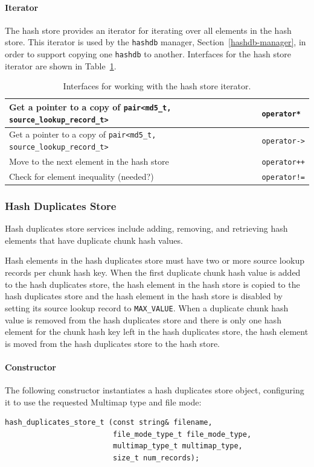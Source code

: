 \documentclass[10pt,twoside]{article}
\newcommand{\hdb}{\texttt{hashdb}\xspace}
\begin{document}
\paragraph{Iterator}
The hash store provides an iterator for iterating over all elements in the hash store.
This iterator is used by the \hdb manager, Section~\ref{hashdb-manager},
in order to support copying one \hdb to another.
Interfaces for the hash store iterator are shown in Table~\ref{hash-store-iterator-interfaces}.
\begin{table}[h]
\center
\begin{tabular}{|p{2in}|p{4in}|}
\hline
Get a pointer to a copy of \texttt{pair<md5\_t, source\_lookup\_record\_t>} & \texttt{operator*} \\
\hline
Get a pointer to a copy of \texttt{pair<md5\_t, source\_lookup\_record\_t>} & \texttt{operator->} \\
\hline
Move to the next element in the hash store & \texttt{operator++} \\
\hline
Check for element inequality (needed?) & \texttt{operator!=} \\
\hline
\end{tabular}
\caption{Interfaces for working with the hash store iterator.\label{hash-store-iterator-interfaces}}
\end{table}

\subsubsection{Hash Duplicates Store}
Hash duplicates store services include adding, removing,
and retrieving hash elements that have duplicate chunk hash values.

Hash elements in the hash duplicates store must have two or more source lookup records
per chunk hash key.
When the first duplicate chunk hash value is added to the hash duplicates store,
the hash element in the hash store is copied to the hash duplicates store
and the hash element in the hash store is disabled by setting
its source lookup record to \texttt{MAX\_VALUE}.
When a duplicate chunk hash value is removed from the hash duplicates store
and there is only one hash element for the chunk hash key left in the hash duplicates store,
the hash element is moved from the hash duplicates store to the hash store.

\paragraph{Constructor}
The following constructor instantiates a hash duplicates store object,
configuring it to use the requested Multimap type and file mode:
\begin{small}
\begin{verbatim}
hash_duplicates_store_t (const string& filename,
                         file_mode_type_t file_mode_type,
                         multimap_type_t multimap_type,
                         size_t num_records);
\end{verbatim}
\end{small}
\end{document}
